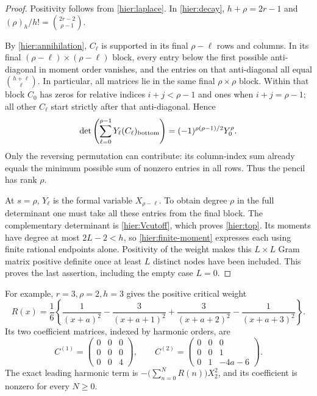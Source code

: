 \documentclass[11pt]{article}
\theoremstyle{definition}
\theoremstyle{remark}
\numberwithin{equation}{section}
\begin{document}
\begin{proof}
Positivity follows from \eqref{hier:laplace}.  In
\eqref{hier:decay}, $h+\rho=2r-1$ and
$(\rho)_h/h!=\binom{2r-2}{\rho-1}$.

By \eqref{hier:annihilation}, $C_\ell$ is supported in its final
$\rho-\ell$ rows and columns.  In its final
$(\rho-\ell)\times(\rho-\ell)$ block, every entry below the first
possible anti-diagonal in moment order vanishes, and the entries on
that anti-diagonal all equal
$\binom{h+\ell}{\ell}$.  In particular, all matrices lie in the
same final $\rho\times\rho$ block.  Within that block $C_0$ has
zeros for relative indices $i+j<\rho-1$ and ones when
$i+j=\rho-1$; all other $C_\ell$ start strictly after that
anti-diagonal.  Hence
\begin{equation}\label{hier:block-det}
 \det\left(\sum_{\ell=0}^{\rho-1}Y_\ell
                  (C_\ell)_{\rm bottom}\right)
     =(-1)^{\rho(\rho-1)/2}Y_0^\rho.
\end{equation}
Only the reversing permutation can contribute: its column-index sum
already equals the minimum possible sum of nonzero entries in all
rows.  Thus the pencil has rank $\rho$.

At $s=\rho$, $Y_\ell$ is the formal variable $X_{\rho-\ell}$.
To obtain degree $\rho$ in the full determinant one must take all
these entries from the final block.  The complementary determinant
is \eqref{hier:Vcutoff}, which proves \eqref{hier:top}.
Its moments have degree at most $2L-2<h$, so
\eqref{hier:finite-moment} expresses each using finite rational
endpoints alone.  Positivity of the weight makes this $L\times L$
Gram matrix positive definite once at least $L$ distinct nodes have
been included.  This proves the last assertion, including the empty
case $L=0$.
\end{proof}

For example, $r=3,\rho=2,h=3$ gives the positive critical weight
\[
 R(x)=\frac16\left\{\frac1{(x+a)^2}-\frac3{(x+a+1)^2}
              +\frac3{(x+a+2)^2}-\frac1{(x+a+3)^2}\right\}.
\]
Its two coefficient matrices, indexed by harmonic orders, are
\[
 C^{(1)}=\begin{pmatrix}0&0&0\\0&0&0\\0&0&4\end{pmatrix},
 \qquad
 C^{(2)}=\begin{pmatrix}0&0&0\\0&0&1\\0&1&-4a-6\end{pmatrix}.
\]
The exact leading harmonic term is
$-\bigl(\sum_{n=0}^N R(n)\bigr)X_2^2$, and its coefficient is
nonzero for every $N\ge0$.
\end{document}
